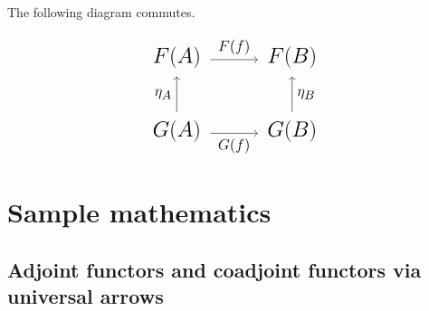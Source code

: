\documentclass[a4paper,12pt]{article}
\newtheorem{Fundamental Theorem}{Fundamental Theorem}
\begin{document}
The following diagram commutes.\\


{\displaymathother

\[{\LARGE
     \begin{tikzcd} F(A) \arrow{r}{F(f)}& F(B) \\
     G(A)\arrow{r}[swap]{G(f)} \arrow{u}{\eta_A} & G(B)
     \arrow{u}[right]{\eta_B}
     \end{tikzcd}
     }
\]

}
\section{Sample mathematics}

\subsection{Adjoint functors and coadjoint functors via universal arrows}\label{adjunctions}
\end{document}
